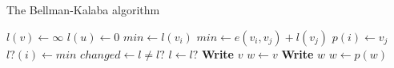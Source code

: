 











\begin{algorithm}
\begin{algorithmic}[1]
\caption{The Bellman-Kalaba algorithm}
\State $l(v) \leftarrow \infty$
\EndFor
\State $l(u) \leftarrow 0$
\Repeat
{}
\State $min \leftarrow l(v_i)$
\State $min \leftarrow e(v_i, v_j) + l(v_j)$
\State $p(i) \leftarrow v_j$
\EndIf
\EndFor
\State $l?(i) \leftarrow min$
\EndFor
\State $changed \leftarrow l \not= l?$
\State $l \leftarrow l?$
\EndProcedure
\Statex
{}
\State \textbf{Write} $v$
\Else
\State $w \leftarrow v$
\State \textbf{Write} $w$
\State $w \leftarrow p(w)$
\EndWhile
\EndIf
\EndProcedure
\end{algorithmic}
\end{algorithm}





